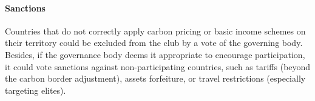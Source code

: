 \documentclass[12pt,english]{article}
\begin{document}




\paragraph{Sanctions}

Countries that do not correctly apply carbon pricing or basic income schemes on their territory could be excluded from the club by a vote of the governing body. 
Besides, if the governance body deems it appropriate to encourage participation, it could vote sanctions against non-participating countries, such as tariffs (beyond the carbon border adjustment), assets forfeiture, or travel restrictions (especially targeting elites). 

\end{document}
